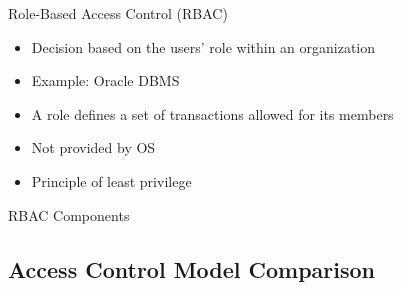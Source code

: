 \begin{definition}{Role-Based Access Control (RBAC)}\\
    \begin{itemize}
        \item Decision based on the users' role within an organization
        \item Example: Oracle DBMS
        \item A role defines a set of transactions allowed for its members
        \item Not provided by OS
        \item Principle of least privilege
    \end{itemize}
    
\end{definition}

\begin{concept}{RBAC Components}\\
\end{concept}

\subsection{Access Control Model Comparison}

